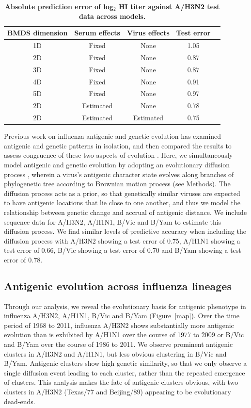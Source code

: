 \documentclass[11pt,oneside,letterpaper]{article}
\begin{document}
\begin{table}[h]
	\centering
	\caption{\textbf{Absolute prediction error of log$_2$ HI titer against A/H3N2 test data across models.}}
	\label{errortable}		
	\begin{tabular}{ c c c c c } 
	\hline
	BMDS dimension 	& 	Serum effects 	&	Virus effects	& 	Test error	\\
	\hline	
	1D 				&	Fixed 			&	None			&	1.05		\\	
	2D 				&	Fixed 			&	None			&	0.87 		\\
	3D 				&	Fixed 			&	None			&	0.87		\\
	4D 				&	Fixed 			&	None			&	0.91		\\
	5D 				&	Fixed 			&	None			&	0.97		\\	
	2D 				&	Estimated 		&	None			&	0.78		\\	
	2D 				&	Estimated 		&	Estimated		&	0.75		\\		
	\hline
	\end{tabular}
\end{table}

Previous work on influenza antigenic and genetic evolution has examined antigenic and genetic patterns in isolation, and then compared the results to assess congruence of these two aspects of evolution \cite{Hay01,Smith04,Russell08}. 
Here, we simultaneously model antigenic and genetic evolution by adopting an evolutionary diffusion process \cite{Lemey10}, wherein a virus's antigenic character state evolves along branches of phylogenetic tree according to Brownian motion process (see Methods).
The diffusion process acts as a prior, so that genetically similar viruses are expected to have antigenic locations that lie close to one another, and thus we model the relationship between genetic change and accrual of antigenic distance.
We include sequence data for A/H3N2, A/H1N1, B/Vic and B/Yam to estimate this diffusion process.
We find similar levels of predictive accuracy when including the diffusion process with A/H3N2 showing a test error of 0.75, A/H1N1 showing a test error of 0.66, B/Vic showing a test error of 0.70 and B/Yam showing a test error of 0.78.

\subsection*{Antigenic evolution across influenza lineages}

Through our analysis, we reveal the evolutionary basis for antigenic phenotype in influenza A/H3N2, A/H1N1, B/Vic and B/Yam (Figure~\ref{map}).
Over the time period of 1968 to 2011, influenza A/H3N2 shows substantially more antigenic evolution than is exhibited by A/H1N1 over the course of 1977 to 2009 or B/Vic and B/Yam over the course of 1986 to 2011.
We observe prominent antigenic clusters in A/H3N2 and A/H1N1, but less obvious clustering in B/Vic and B/Yam.
Antigenic clusters show high genetic similarity, so that we only observe a single diffusion event leading to each cluster, rather than the repeated emergence of clusters.
This analysis makes the fate of antigenic clusters obvious, with two clusters in A/H3N2 (Texas/77 and Beijing/89) appearing to be evolutionary dead-ends.
\end{document}
